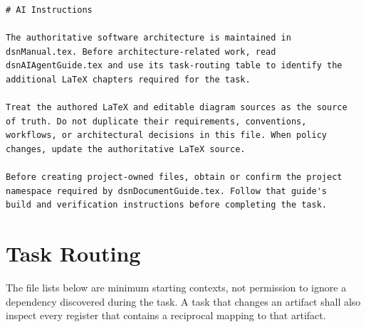\begin{verbatim}
# AI Instructions

The authoritative software architecture is maintained in
dsnManual.tex. Before architecture-related work, read
dsnAIAgentGuide.tex and use its task-routing table to identify the
additional LaTeX chapters required for the task.

Treat the authored LaTeX and editable diagram sources as the source
of truth. Do not duplicate their requirements, conventions,
workflows, or architectural decisions in this file. When policy
changes, update the authoritative LaTeX source.

Before creating project-owned files, obtain or confirm the project
namespace required by dsnDocumentGuide.tex. Follow that guide's
build and verification instructions before completing the task.
\end{verbatim}

\section{Task Routing}
The file lists below are minimum starting contexts, not permission to ignore a
dependency discovered during the task. A task that changes an artifact shall
also inspect every register that contains a reciprocal mapping to that
artifact.

